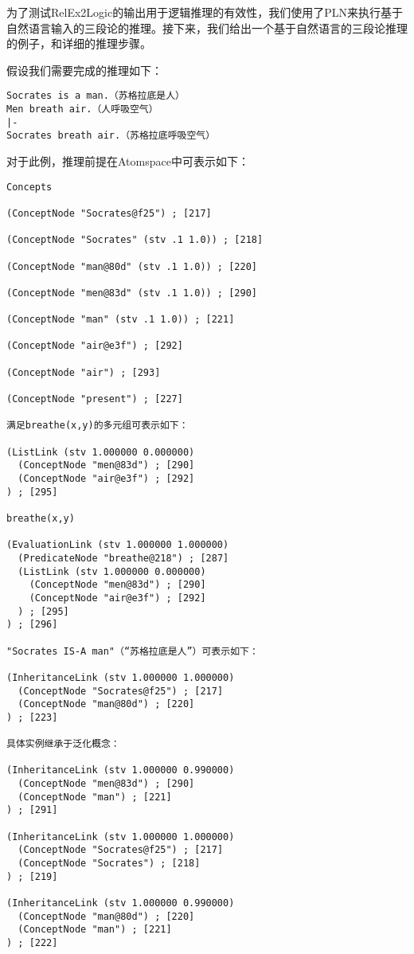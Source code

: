 为了测试RelEx2Logic的输出用于逻辑推理的有效性，我们使用了PLN来执行基于自然语言输入的三段论的推理。接下来，我们给出一个基于自然语言的三段论推理的例子，和详细的推理步骤。


假设我们需要完成的推理如下：

\begin{verbatim}
Socrates is a man.（苏格拉底是人）
Men breath air.（人呼吸空气）
|- 
Socrates breath air.（苏格拉底呼吸空气）
\end{verbatim}

对于此例，推理前提在Atomspace中可表示如下：

{\tt\begin{small}\begin{lstlisting}
Concepts

(ConceptNode "Socrates@f25") ; [217]

(ConceptNode "Socrates" (stv .1 1.0)) ; [218]

(ConceptNode "man@80d" (stv .1 1.0)) ; [220]

(ConceptNode "men@83d" (stv .1 1.0)) ; [290]

(ConceptNode "man" (stv .1 1.0)) ; [221]

(ConceptNode "air@e3f") ; [292]

(ConceptNode "air") ; [293]

(ConceptNode "present") ; [227]

满足breathe(x,y)的多元组可表示如下：

(ListLink (stv 1.000000 0.000000)
  (ConceptNode "men@83d") ; [290]
  (ConceptNode "air@e3f") ; [292]
) ; [295]

breathe(x,y)

(EvaluationLink (stv 1.000000 1.000000)
  (PredicateNode "breathe@218") ; [287]
  (ListLink (stv 1.000000 0.000000)
    (ConceptNode "men@83d") ; [290]
    (ConceptNode "air@e3f") ; [292]
  ) ; [295]
) ; [296]

"Socrates IS-A man"（“苏格拉底是人”）可表示如下：

(InheritanceLink (stv 1.000000 1.000000)
  (ConceptNode "Socrates@f25") ; [217]
  (ConceptNode "man@80d") ; [220]
) ; [223]

具体实例继承于泛化概念：

(InheritanceLink (stv 1.000000 0.990000)
  (ConceptNode "men@83d") ; [290]
  (ConceptNode "man") ; [221]
) ; [291]

(InheritanceLink (stv 1.000000 1.000000)
  (ConceptNode "Socrates@f25") ; [217]
  (ConceptNode "Socrates") ; [218]
) ; [219]

(InheritanceLink (stv 1.000000 0.990000)
  (ConceptNode "man@80d") ; [220]
  (ConceptNode "man") ; [221]
) ; [222]
 \end{lstlisting}\end{small}}
 

